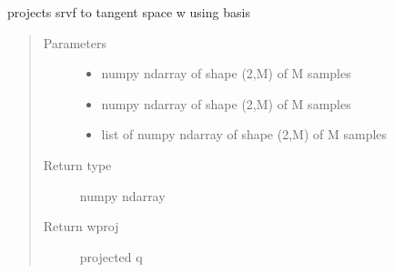 \documentclass[letterpaper,10pt,english]{sphinxmanual}
\begin{document}

\begin{fulllineitems}
\label{\detokenize{curve_functions:curve_functions.project_tangent}}
projects srvf to tangent space w using basis
\begin{quote}\begin{description}
\item[{Parameters}] \leavevmode\begin{itemize}
\item {} 
 \textendash{} numpy ndarray of shape (2,M) of M samples

\item {} 
 \textendash{} numpy ndarray of shape (2,M) of M samples

\item {} 
 \textendash{} list of numpy ndarray of shape (2,M) of M samples

\end{itemize}

\item[{Return type}] \leavevmode
numpy ndarray

\item[{Return wproj}] \leavevmode
projected q

\end{description}\end{quote}

\end{fulllineitems}

\end{document}
